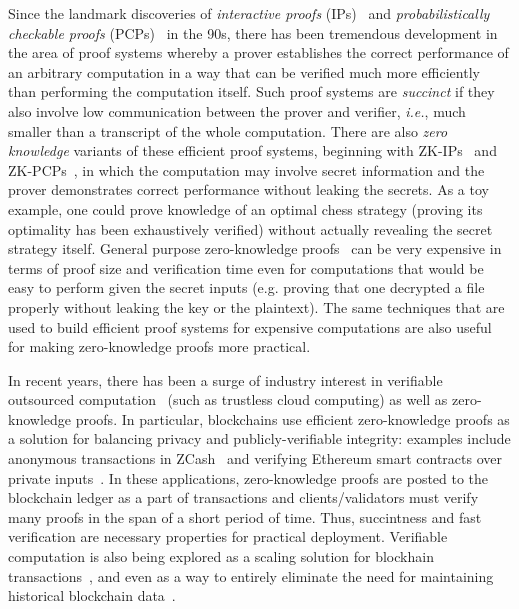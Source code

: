 
Since the landmark discoveries of \emph{interactive proofs} (IPs)~\cite{STOC:GolMicRac85} and %
\emph{probabilistically checkable proofs} (PCPs)~\cite{STOC:BFLS91,FOCS:ALMSS92} in the 90s, there has been tremendous development in the area of proof systems whereby a prover establishes the correct performance of an arbitrary computation in a way that can be verified much more efficiently than performing the computation itself. Such proof systems are \emph{succinct} if they also involve low communication between the prover and verifier, \emph{i.e.}, much smaller than a transcript of the whole computation. There are also \emph{zero knowledge} variants of these efficient proof systems, beginning with ZK-IPs~\cite{C:BGGHKMR88} and ZK-PCPs~\cite{STOC:Kilian92}, in which the computation may involve secret information and the prover demonstrates correct performance without leaking the secrets. As a toy example, one could prove knowledge of an optimal chess strategy (proving its optimality has been exhaustively verified) without actually revealing the secret strategy itself. General purpose zero-knowledge proofs~\cite{JACM:GMW91} can be very expensive in terms of proof size and verification time even for computations that would be easy to perform given the secret inputs (e.g. proving that one decrypted a file properly without leaking the key or the plaintext). The same techniques that are used to build efficient proof systems for expensive computations are also useful for making zero-knowledge proofs more practical. 
 
In recent years, there has been a surge of industry interest in verifiable outsourced computation~\cite{WalBlu15} (such as trustless cloud computing) as well as zero-knowledge proofs. In particular, blockchains use efficient zero-knowledge proofs as a solution for balancing privacy and publicly-verifiable integrity: examples include anonymous transactions in ZCash~\cite{SP:BCGGMT14,Zcash} and verifying Ethereum smart contracts over private inputs~\cite{Zokrates}. In these applications, zero-knowledge proofs are posted to the blockchain ledger as a part of transactions and clients/validators must verify many proofs in the span of a short period of time. Thus, succintness and fast verification are necessary properties for practical deployment. Verifiable computation is also being explored as a scaling solution for blockhain transactions~\cite{ZK-rollup}, and even as a way to entirely eliminate the need for maintaining historical blockchain data~\cite{Coda}. 

